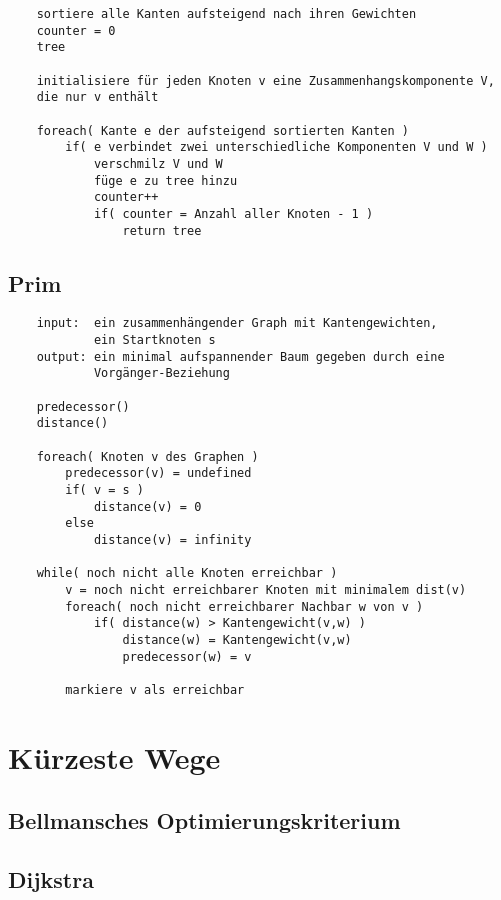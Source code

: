 \documentclass[10pt,a4paper,landscape]{article}
\begin{document}
\begin{multicols*}{2}
\begin{verbatim}
    sortiere alle Kanten aufsteigend nach ihren Gewichten
    counter = 0
    tree

    initialisiere für jeden Knoten v eine Zusammenhangskomponente V, 
    die nur v enthält

    foreach( Kante e der aufsteigend sortierten Kanten )
        if( e verbindet zwei unterschiedliche Komponenten V und W )
            verschmilz V und W
            füge e zu tree hinzu
            counter++
            if( counter = Anzahl aller Knoten - 1 )
                return tree
            \end{verbatim}

            \subsection{ Prim }
            \begin{verbatim}
    input:  ein zusammenhängender Graph mit Kantengewichten, 
            ein Startknoten s
    output: ein minimal aufspannender Baum gegeben durch eine 
            Vorgänger-Beziehung
    
    predecessor()
    distance()

    foreach( Knoten v des Graphen )
        predecessor(v) = undefined
        if( v = s )
            distance(v) = 0
        else
            distance(v) = infinity

    while( noch nicht alle Knoten erreichbar )
        v = noch nicht erreichbarer Knoten mit minimalem dist(v)
        foreach( noch nicht erreichbarer Nachbar w von v )
            if( distance(w) > Kantengewicht(v,w) )
                distance(w) = Kantengewicht(v,w)
                predecessor(w) = v
        
        markiere v als erreichbar
            \end{verbatim}


        \section{ Kürzeste Wege }
            \subsection{ Bellmansches Optimierungskriterium }

            \subsection{ Dijkstra }


\end{multicols*}
\end{document}
